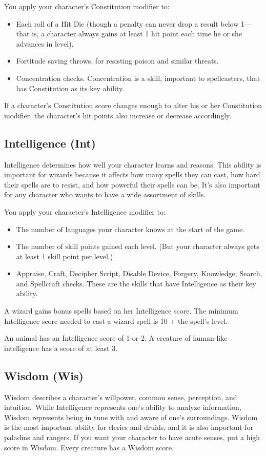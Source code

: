 \documentclass[10pt,a4paper,twocolumn]{d20}
\begin{document}
You apply your character’s Constitution modifier to:
\begin{itemize}
\item Each roll of a Hit Die (though a penalty can never drop a result below 1---that is, a character always gains at least 1 hit point each time he or she advances in level).
\item Fortitude saving throws, for resisting poison and similar threats.
\item Concentration checks. Concentration is a skill, important to spellcasters, that has Constitution as its key ability.
\end{itemize}

If a character’s Constitution score changes enough to alter his or her Constitution modifier, the character’s hit points also increase or decrease accordingly.

\subsection{Intelligence (Int)}
Intelligence determines how well your character learns and reasons. This ability is important for wizards because it affects how many spells they can cast, how hard their spells are to resist, and how powerful their spells can be. It’s also important for any character who wants to have a wide assortment of skills.

You apply your character’s Intelligence modifier to:

\begin{itemize}
\item The number of languages your character knows at the start of the game.
\item The number of skill points gained each level. (But your character always gets at least 1 skill point per level.)
\item Appraise, Craft, Decipher Script, Disable Device, Forgery, Knowledge, Search, and Spellcraft checks. These are the skills that have Intelligence as their key ability.
\end{itemize}

A wizard gains bonus spells based on her Intelligence score. The minimum Intelligence score needed to cast a wizard spell is 10 + the spell’s level.

An animal has an Intelligence score of 1 or 2. A creature of human-like intelligence has a score of at least 3.

\subsection{Wisdom (Wis)}
Wisdom describes a character’s willpower, common sense, perception, and intuition. While Intelligence represents one’s ability to analyze information, Wisdom represents being in tune with and aware of one’s surroundings. Wisdom is the most important ability for clerics and druids, and it is also important for paladins and rangers. If you want your character to have acute senses, put a high score in Wisdom. Every creature has a Wisdom score.
\end{document}
